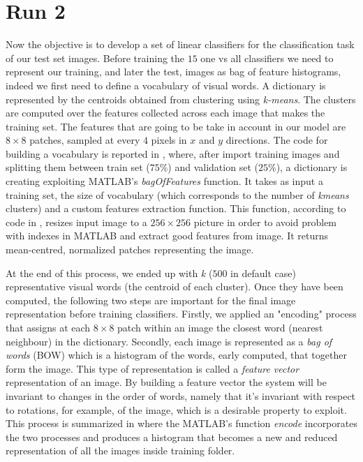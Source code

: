 \section{Run 2}

Now the objective is to develop a set of linear classifiers for the classification task of our test set images. Before training the $15$ one vs all classifiers we need to represent our training, and later the test, images as bag of feature histograms, indeed we first need to define a vocabulary of visual words. A dictionary is represented by the centroids obtained from clustering using \textit{k-means}. The clusters are computed over the features collected across each image that makes the training set. The features that are going to be take in account in our model are $8\times 8$ patches, sampled at every $4$ pixels in $x$ and $y$ directions. The code for building a vocabulary is reported in , where, after import training images and splitting them between train set ($75\%$) and validation set ($25\%$), a dictionary is creating exploiting MATLAB's \textit{bagOfFeatures} function. It takes as input a training set, the size of vocabulary (which corresponds to the number of \textit{kmeans} clusters) and a custom features extraction function. This function, according to code in , resizes input image to a $256\times 256$ picture in order to avoid problem with indexes in MATLAB and extract good features from image. It returns mean-centred, normalized patches representing the image.

At the end of this process, we ended up with \textit{k} ($500$ in default case) representative visual words (the centroid of each cluster). Once they have been computed, the following two steps are important for the final image representation before training classifiers. Firstly, we applied an "encoding" process that assigns at each $8\times 8$ patch within an image the closest word (nearest neighbour) in the dictionary. Secondly, each image is represented as a \textit{bag of words} (BOW) which is a histogram of the words, early computed, that together form the image. This type of representation is called a \textit{feature vector} representation of an image. By building a feature vector the system will be invariant to changes in the order of words, namely that it's invariant with respect to rotations, for example, of the image, which is a desirable property to exploit. This process is summarized in  where the MATLAB's function \textit{encode} incorporates the two processes and produces a histogram that becomes a new and reduced representation of all the images inside training folder.

